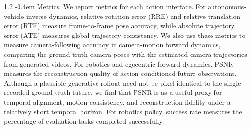 \documentclass{llmxive}
\makeatletter
\providecommand{\paragraph}{  \@startsection{paragraph}{4}{\z@}    {1\baselineskip \@plus .2\baselineskip}    {-0.4em}    {\normalfont\normalsize\bfseries}}
\makeatother
\begin{document}
\paragraph{Metrics.} We report metrics for each action interface. For autonomous-vehicle inverse dynamics, relative rotation error (RRE) and relative translation error (RTE) measure frame-to-frame pose accuracy, while absolute trajectory error (ATE) measures global trajectory consistency. We also use these metrics to measure camera-following accuracy in camera-motion forward dynamics, comparing the ground-truth camera poses with the estimated camera trajectories from generated videos. For robotics and egocentric forward dynamics, PSNR measures the reconstruction quality of action-conditioned future observations. Although a plausible generative rollout need not be pixel-identical to the single recorded ground-truth future, we find that PSNR is as a useful proxy for temporal alignment, motion consistency, and reconstruction fidelity under a relatively short temporal horizon. For robotics policy, success rate measures the percentage of evaluation tasks completed successfully.
\end{document}
